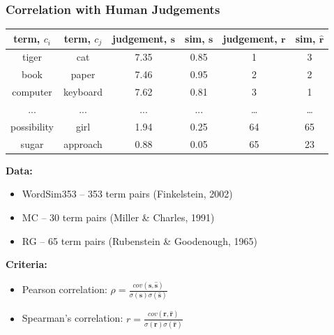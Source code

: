 \documentclass{beamer}
\begin{document}
\begin{frame}
\frametitle{Correlation with Human Judgements}

\begin{table}[h]\footnotesize
\begin{tabular}{ |c|c|c|c|c|c| }
\hline
  term, $c_i$ & term, $c_j$ & judgement, $\mathbf{s}$  & sim, $\mathbf{s}$  & judgement, $\mathbf{r}$ & sim, $\hat{\mathbf{r}}$  \\ \hline \hline
tiger & cat & 7.35 & 0.85 & 1 & 3 \\
book & paper & 7.46 &  0.95 & 2 & 2 \\
computer & keyboard & 7.62 &  0.81 & 3 & 1 \\
... & ... & ... & ...   & \ldots & \ldots \\
possibility & girl & 1.94 & 0.25 & 64 & 65 \\
sugar & approach & 0.88 & 0.05 & 65 & 23 \\ \hline
\end{tabular}
\end{table}


\textbf{Data:}

\begin{itemize}
	\item WordSim353 -- 353 term pairs (Finkelstein, 2002)  
	\item MC -- 30 term pairs  (Miller & Charles, 1991)
	\item RG -- 65 term pairs (Rubenstein & Goodenough, 1965)  
\end{itemize}

\textbf{Criteria:}
\begin{itemize}
\item Pearson correlation:  $\rho = \frac{cov(\mathbf{s},\hat{\mathbf{s}})}{\sigma(\mathbf{s}) \sigma(\hat{\mathbf{s}})}$

 \item Spearman's correlation: $r = \frac{cov(\mathbf{r},\hat{\mathbf{r}})}{\sigma(\mathbf{r}) \sigma(\hat{\mathbf{r}})}$
 
 \end{itemize}
 
\end{frame}
\end{document}
